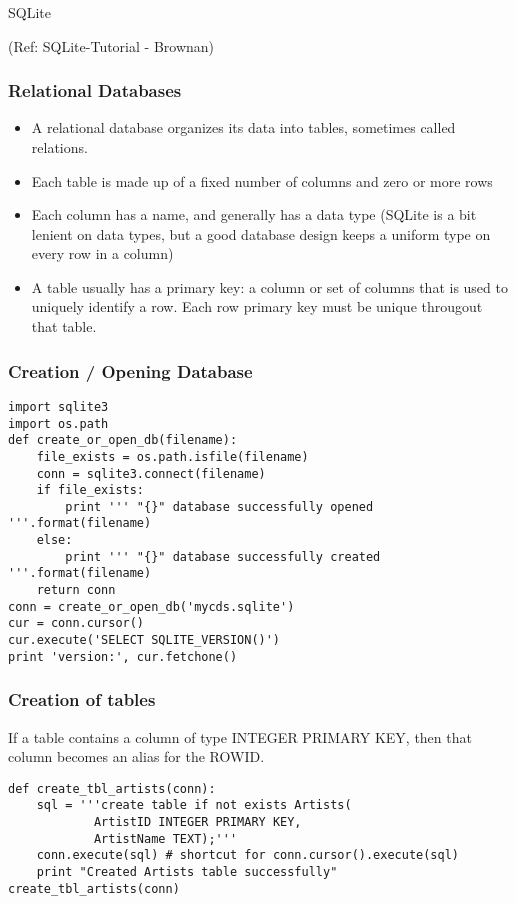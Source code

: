 \begin{frame}[fragile]\frametitle{}
\begin{center}
{\Large SQLite}

(Ref: SQLite-Tutorial - Brownan)
\end{center}
\end{frame}

\begin{frame}[fragile] \frametitle{Relational Databases}
\begin{itemize}
\item A relational database organizes its data into tables, sometimes called relations.
\item Each table is made up of a fixed number of columns and zero or more rows
\item Each column has a name, and generally has a data type (SQLite is a bit lenient on data types, but a good database design keeps a uniform type on every row in a column)
\item A table usually has a primary key: a column or set of columns that is used to uniquely identify a row. Each row primary key must be unique througout that table.
\end{itemize}
\end{frame}

\begin{frame}[fragile] \frametitle{Creation / Opening Database}
\begin{lstlisting}
import sqlite3
import os.path
def create_or_open_db(filename):
    file_exists = os.path.isfile(filename)
    conn = sqlite3.connect(filename)
    if file_exists:
        print ''' "{}" database successfully opened '''.format(filename)
    else:
        print ''' "{}" database successfully created '''.format(filename)
    return conn
conn = create_or_open_db('mycds.sqlite')
cur = conn.cursor()
cur.execute('SELECT SQLITE_VERSION()')
print 'version:', cur.fetchone() 
\end{lstlisting}

\end{frame}

\begin{frame}[fragile] \frametitle{Creation of tables}
If a table contains a column of type INTEGER PRIMARY KEY, then that column becomes an alias for the ROWID.
\begin{lstlisting}
def create_tbl_artists(conn):
    sql = '''create table if not exists Artists(
            ArtistID INTEGER PRIMARY KEY,
            ArtistName TEXT);'''
    conn.execute(sql) # shortcut for conn.cursor().execute(sql)
    print "Created Artists table successfully"
create_tbl_artists(conn)
\end{lstlisting}

\end{frame}


